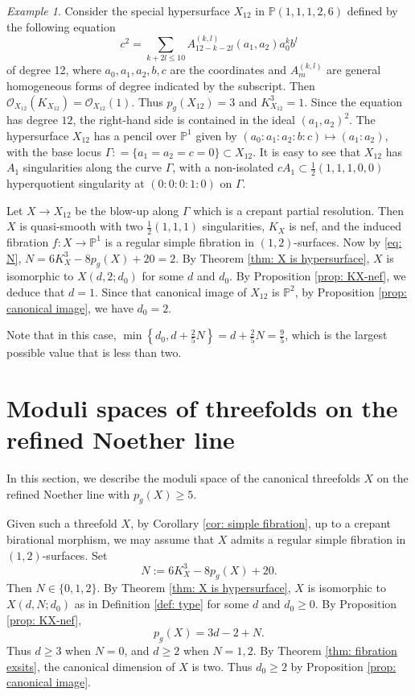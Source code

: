 \documentclass[a4paper,11pt]{amsart}
\newcommand{\PP}{\ensuremath{\mathbb{P}}}
\theoremstyle{definition}
\theoremstyle{remark}
\newtheorem{example}[thm]{Example}
\numberwithin{equation}{section}
\begin{document}
\begin{example} \label{ex!X(1,2;2)}
	Consider the special hypersurface $X_{12}$ in $\PP(1,1,1,2,6)$ defined by the following equation
	$$
	c^2 = \sum_{k+2l \le 10} A^{(k,l)}_{12-k-2l}(a_1,a_2)a_0^kb^l
	$$
	of degree 12, where $a_0, a_1, a_2, b, c$ are the coordinates and $A_m^{(k,l)}$ are general homogeneous forms of degree indicated by the subscript. Then $\mathcal{O}_{X_{12}}(K_{X_{12}}) = \mathcal{O}_{X_{12}}(1)$. Thus $p_g(X_{12}) = 3$ and $K_{X_{12}}^3 = 1$. Since the equation has degree $12$, the right-hand side is contained in the ideal $(a_1,a_2)^2$. The hypersurface $X_{12}$ has a pencil over $\PP^1$ given by $(a_0: a_1: a_2: b: c) \mapsto (a_1: a_2)$, with the base locus $\Gamma : = \{a_1 = a_2 = c = 0\} \subset X_{12}$. It is easy to see that $X_{12}$ has $A_1$ singularities along the curve $\Gamma$, with a non-isolated $cA_1 \subset \frac12(1,1,1,0,0)$ hyperquotient singularity at $(0:0:0:1:0)$ on $\Gamma$. 
	
	Let $X \to X_{12}$ be the blow-up along $\Gamma$ which is a crepant partial resolution. Then $X$ is quasi-smooth with two $\frac12(1,1,1)$ singularities, $K_X$ is nef, and the induced fibration $f: X \to \PP^1$ is a regular simple fibration in $(1, 2)$-surfaces. Now by \eqref{eq: N}, $N = 6K_X^3 - 8p_g(X) + 20 = 2$. By Theorem \ref{thm: X is hypersurface}, $X$ is isomorphic to $X(d, 2; d_0)$ for some $d$ and $d_0$. By Proposition \ref{prop: KX-nef}, we deduce that $d = 1$. Since that canonical image of $X_{12}$ is $\PP^2$, by Proposition \ref{prop: canonical image}, we have $d_0 = 2$.
	
	Note that in this case, $\min\left\{d_0, d + \frac25N\right\} = d + \frac25N = \frac{9}{5}$, which is the largest possible value that is less than two.
\end{example}


\section{Moduli spaces of threefolds on the refined Noether line} \label{section: moduli}

In this section, we describe the moduli space of the canonical threefolds $X$ on the refined Noether line with $p_g(X) \geq 5$. 

Given such a threefold $X$, by Corollary \ref{cor: simple fibration}, up to a crepant birational morphism, we may assume that $X$ admits a regular simple fibration in $(1, 2)$-surfaces. Set 
$$
N := 6K_X^3 - 8p_g(X) + 20.
$$ 
Then $N \in \{0, 1, 2\}$. By Theorem \ref{thm: X is hypersurface}, $X$ is isomorphic to $X(d, N; d_0)$ as in Definition \ref{def: type} for some $d$ and $d_0 \ge 0$. By Proposition \ref{prop: KX-nef}, 
$$
p_g(X) = 3d - 2 + N.
$$ 
Thus $d \ge 3$ when $N = 0$, and $d \ge 2$ when $N = 1, 2$. By Theorem \ref{thm: fibration exsits}, the canonical dimension of $X$ is two. Thus $d_0 \ge 2$ by Proposition \ref{prop: canonical image}. 
\end{document}
